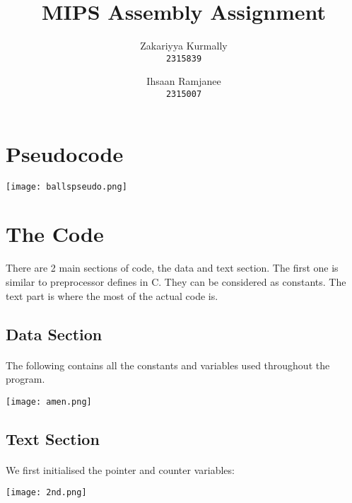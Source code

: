 \documentclass{article}
\title{MIPS Assembly Assignment}
\author{
  Zakariyya Kurmally \\
  \texttt{2315839}
  \and
  Ihsaan Ramjanee \\
  \texttt{2315007}
}
\begin{document}
\maketitle

\pagebreak

\tableofcontents

\pagebreak

\section{Pseudocode}
\begin{center}
  \texttt{[image: ballspseudo.png]}
\end{center}

\section{The Code}
There are 2 main sections of code, the data and text section. The first
one is similar to preprocessor defines in C. They can be considered as
constants. The text part is where the most of the actual code is. 

\pagebreak

\subsection{Data Section}
\paragraph{}
The following contains all the constants and variables used throughout the 
program. 

\begin{center}
  \texttt{[image: amen.png]}
\end{center}

\subsection{Text Section}
\paragraph{}
We first initialised the pointer and counter variables:

\begin{center}
  \texttt{[image: 2nd.png]}
\end{center}
\end{document}
